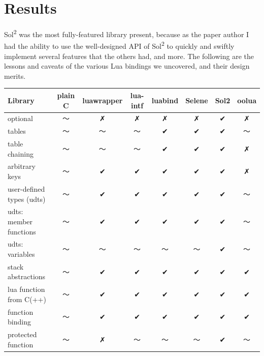 \documentclass[conference,compsoc]{IEEEtran}
\newcommand{\soltwo}{Sol\textsuperscript{2}}
\begin{document}
\section{Results}

\soltwo{} was the most fully-featured library present, because as the paper author I had the ability to use the well-designed API of \soltwo{} to quickly and swiftly implement several features that the others had, and more. The following are the lessons and caveats of the various Lua bindings we uncovered, and their design merits.

\begin{table}[ht!]
	\centering
	\begin{tabular}{l c c c c c c c }
		Library                  &   plain C   & luawrapper & lua-intf & luabind &  Selene  &    Sol2   &   oolua   
		\\ \hline
		optional                  &      〜      &     ✗      &     ✗    &    ✗    &     ✗    &     ✔     &     ✗     
		\\ \hline
		tables                    &      〜      &     〜      &     〜    &    ✔    &     ✔    &     ✔     &     〜     
		\\ \hline
		table chaining            &      〜      &     〜      &     〜    &    ✔    &     ✔    &     ✔     &     ✗     
		\\ \hline
		arbitrary keys            &      〜      &     ✔      &     ✔    &    ✔    &     ✔    &     ✔     &     ✗     
		\\ \hline
		user-defined types (udts) &      〜      &     ✔      &     ✔    &    ✔    &     ✔    &     ✔     &     〜     
		\\ \hline
		udts: member functions    &      〜      &     ✔      &     ✔    &    ✔    &     ✔    &     ✔     &     〜     
		\\ \hline
		udts: variables           &      〜      &     〜      &     〜    &    〜    &     〜    &     ✔     &     〜     
		\\ \hline
		stack abstractions        &      〜      &     ✔      &     ✔    &    ✔    &     ✔    &     ✔     &     ✔     
		\\ \hline
		lua function from C(++)   &      〜      &     ✔      &     ✔    &    ✔    &     ✔    &     ✔     &     ✔     
		\\ \hline
		function binding          &      〜      &     ✔      &     ✔    &    ✔    &     ✔    &     ✔     &     ✔     
		\\ \hline
		protected function        &      〜      &     ✗      &     〜    &    〜    &     〜    &     ✔     &     〜     

\end{tabular}
\end{table}
\end{document}
